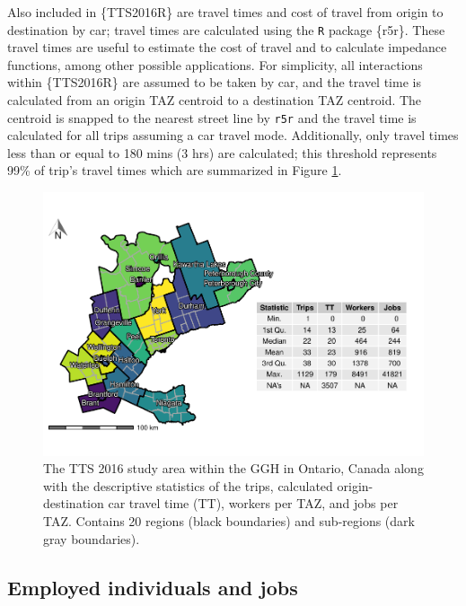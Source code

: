 \documentclass[Royal,times,sageh]{sagej}
\begin{document}
Also included in \{TTS2016R\} are travel times and cost of travel from
origin to destination by car; travel times are calculated using the
\texttt{R} package \{r5r\}. These travel times are useful to estimate
the cost of travel and to calculate impedance functions, among other
possible applications. For simplicity, all interactions within
\{TTS2016R\} are assumed to be taken by car, and the travel time is
calculated from an origin TAZ centroid to a destination TAZ centroid.
The centroid is snapped to the nearest street line by \texttt{r5r} and
the travel time is calculated for all trips assuming a car travel mode.
Additionally, only travel times less than or equal to 180 mins (3 hrs)
are calculated; this threshold represents 99\% of trip's travel times
which are summarized in Figure \ref{fig:TTS-16-survey-area}.

\begin{figure}

{\centering \includegraphics[width=1\linewidth]{Manuscript-Data-Package_files/figure-latex/TTS-16-survey-area-1} 

}

\caption{\label{fig:TTS-16-survey-area}The TTS 2016 study area within the GGH in Ontario, Canada along with the descriptive statistics of the trips, calculated origin-destination car travel time (TT), workers per TAZ, and jobs per TAZ. Contains 20 regions (black boundaries) and sub-regions (dark gray boundaries).}\label{fig:TTS-16-survey-area}
\end{figure}

\hypertarget{employed-individuals-and-jobs}{%
\subsection{Employed individuals and
jobs}\label{employed-individuals-and-jobs}}
\end{document}
